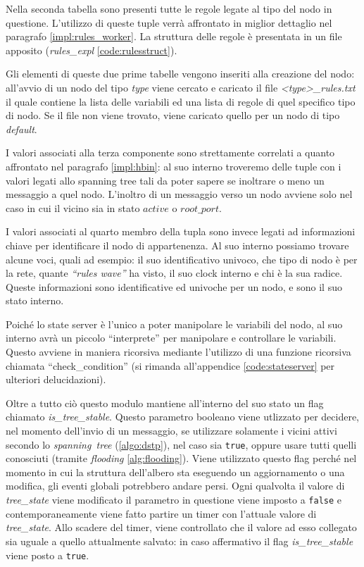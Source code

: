 \documentclass[italian]{memoir}
\begin{document}
Nella seconda tabella sono presenti tutte le regole legate al tipo del nodo in questione. L'utilizzo di queste tuple verrà affrontato in miglior dettaglio nel paragrafo \ref{impl:rules_worker}.
La struttura delle regole è presentata in un file apposito (\textit{rules\_expl} \ref{code:rulesstruct}).

Gli elementi di queste due prime tabelle vengono inseriti alla creazione del nodo: all'avvio di un nodo del tipo \textit{type} viene cercato e caricato il file \textit{<type>\_rules.txt} il quale contiene la lista delle variabili ed una lista di regole di quel specifico tipo di nodo. Se il file non viene trovato, viene caricato quello per un nodo di tipo \textit{default}.

I valori associati alla terza componente sono strettamente correlati a quanto affrontato nel paragrafo \ref{impl:hbin}: al suo interno troveremo delle tuple con i valori legati allo spanning tree tali da poter sapere se inoltrare o meno un messaggio a quel nodo. L'inoltro di un messaggio verso un nodo avviene solo nel caso in cui il vicino sia in stato $active$ o $root\_port$.

I valori associati al quarto membro della tupla sono invece legati ad informazioni chiave per identificare il nodo di appartenenza. Al suo interno possiamo trovare alcune voci, quali ad esempio: il suo identificativo univoco, che tipo di nodo è per la rete, quante \textit{``rules wave''} ha visto, il suo clock interno e chi è la sua radice. Queste informazioni sono identificative ed univoche per un nodo, e sono il suo stato interno.

Poiché lo state server è l'unico a poter manipolare le variabili del nodo, al suo interno avrà un piccolo ``interprete'' per manipolare e controllare le variabili. Questo avviene in maniera ricorsiva mediante l'utilizzo di una funzione ricorsiva chiamata ``check\_condition'' (si rimanda all'appendice \ref{code:stateserver} per ulteriori delucidazioni).

Oltre a tutto ciò questo modulo mantiene all'interno del suo stato un flag chiamato \textit{is\_tree\_stable}. Questo parametro booleano viene utlizzato per decidere, nel momento dell'invio di un messaggio, se utilizzare solamente i vicini attivi secondo lo \textit{spanning~tree} (\ref{algo:dstp}), nel caso sia \texttt{true}, oppure usare tutti quelli conosciuti (tramite \textit{flooding} \ref{alg:flooding}). Viene utilizzato questo flag perché nel momento in cui la struttura dell'albero sta eseguendo un aggiornamento o una modifica, gli eventi globali potrebbero andare persi. Ogni qualvolta il valore di \textit{tree\_state} viene modificato il parametro in questione viene imposto a \texttt{false} e contemporaneamente viene fatto partire un timer con l'attuale valore di \textit{tree\_state}. Allo scadere del timer, viene controllato che il valore ad esso collegato sia uguale a quello attualmente salvato: in caso affermativo il flag \textit{is\_tree\_stable} viene posto a \texttt{true}.
\end{document}
